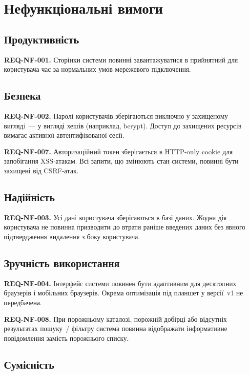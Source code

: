 \section{Нефункціональні вимоги}
\label{sec:nefunktsionalni-vymohy}

\subsection{Продуктивність}

\textbf{REQ-NF-001.} Сторінки системи повинні завантажуватися в прийнятний для користувача час за нормальних умов мережевого підключення. 

\subsection{Безпека}

\textbf{REQ-NF-002.} Паролі користувачів зберігаються виключно у захищеному вигляді~--- у вигляді хешів (наприклад, bcrypt). Доступ до захищених ресурсів вимагає активної автентифікованої сесії. 

\textbf{REQ-NF-007.} Авторизаційний токен зберігається в HTTP-only cookie для запобігання XSS-атакам. Всі запити, що змінюють стан системи, повинні бути захищені від CSRF-атак. 

\subsection{Надійність}

\textbf{REQ-NF-003.} Усі дані користувача зберігаються в базі даних. Жодна дія користувача не повинна призводити до втрати раніше введених даних без явного підтвердження видалення з боку користувача. 

\subsection{Зручність використання}

\textbf{REQ-NF-004.} Інтерфейс системи повинен бути адаптивним для десктопних браузерів і мобільних браузерів. Окрема оптимізація під планшет у версії~v1 не передбачена. 

\textbf{REQ-NF-008.} При порожньому каталозі, порожній добірці або відсутніх результатах пошуку~/ фільтру система повинна відображати інформативне повідомлення замість порожнього списку. 

\subsection{Сумісність}

